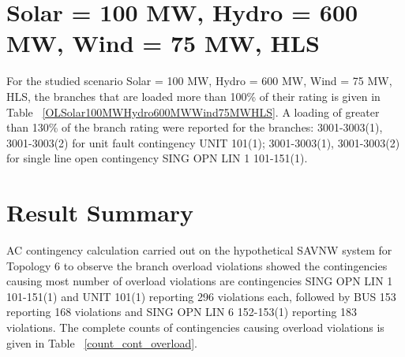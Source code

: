 \documentclass[10pt]{report}
\begin{document}
\section{Solar = 100 MW, Hydro = 600 MW, Wind = 75 MW, HLS}
For the studied scenario Solar = 100 MW, Hydro = 600 MW, Wind = 75 MW, HLS, the branches that are loaded more than 100\% of their rating is given in Table ~\ref{OLSolar100MWHydro600MWWind75MWHLS}. A loading of greater than 130\% of the branch rating were reported for the branches: 3001-3003(1), 3001-3003(2) for unit fault contingency UNIT 101(1); 3001-3003(1), 3001-3003(2) for single line open contingency SING OPN LIN   1 101-151(1).
\begin{table}[H]
\caption{Contingencies causing branch flow greater than 100\% for scenario Solar = 100 MW, Hydro = 600 MW, Wind = 75 MW, HLS}
\label{OLSolar100MWHydro600MWWind75MWHLS}
\centering
{}
\end{table}



\section{Result Summary}
AC contingency calculation carried out on the hypothetical SAVNW system for Topology 6 to observe the branch overload violations showed the contingencies causing most number of overload violations are contingencies SING OPN LIN 1 101-151(1) and UNIT 101(1) reporting 296 violations each, followed by BUS 153 reporting 168 violations and SING OPN LIN 6 152-153(1) reporting 183 violations. The complete counts of contingencies causing overload violations is given in Table ~\ref {count_cont_overload}. 
\end{document}
